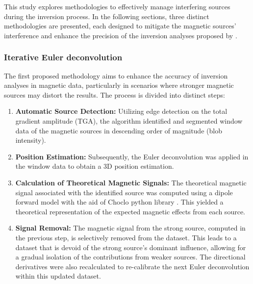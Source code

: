This study explores methodologies to effectively manage interfering sources during the inversion process. In the following sections, three distinct methodologies are presented, each designed to mitigate the magnetic sources' interference and enhance the precision of the inversion analyses proposed by \citet{Souza-Junior2023b}.


\subsubsection{Iterative Euler deconvolution}

The first proposed methodology aims to enhance the accuracy of inversion analyses in magnetic data, particularly in scenarios where stronger magnetic sources may distort the results. The process is divided into distinct steps:

\begin{enumerate}
  \item \textbf{Automatic Source Detection:} Utilizing edge detection on the total gradient amplitude (TGA), the algorithm identified and segmented window data of the magnetic sources in descending order of magnitude (blob intensity). 

  \item \textbf{Position Estimation:} Subsequently, the Euler deconvolution was applied in the window data to obtain a 3D position estimation.
  
  \item \textbf{Calculation of Theoretical Magnetic Signals:} The theoretical magnetic signal associated with the identified source was computed using a dipole forward model with the aid of Choclo python library \citep{choclo2022}. This yielded a theoretical representation of the expected magnetic effects from each source.
  
  \item \textbf{Signal Removal:} The magnetic signal from the strong source, computed in the previous step, is selectively removed from the dataset. This leads to a dataset that is devoid of the strong source's dominant influence, allowing for a gradual isolation of the contributions from weaker sources. The directional derivatives were also recalculated to re-calibrate the next Euler deconvolution within this updated dataset.
    
\end{enumerate}

